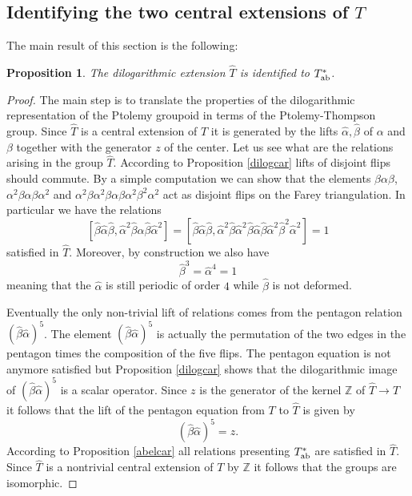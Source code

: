 \documentclass[twoside]{irmaems}
\theoremstyle{plain}
\newtheorem{proposition}[theorem]{Proposition}
\theoremstyle{definition}
\theoremstyle{remark}
\newcommand{\Z}{{\mathbb{Z}}}
\newcommand{\al}{\widehat{\alpha}}
\newcommand{\be}{\widehat{\beta}}
\begin{document}
\subsection{Identifying the two central extensions of $T$}\label{ident}

\vspace{0.2cm}
\noindent 
The main result of this section is the following: 

\begin{proposition} 
The dilogarithmic extension $\widehat{T}$ is identified to $T^*_{\rm ab}$. 
\end{proposition}
\begin{proof}
The main step is to translate the properties of the dilogarithmic 
representation of the Ptolemy groupoid in terms of the Ptolemy-Thompson group.  
Since $\widehat{T}$ is a central extension 
of $T$ it is generated by the lifts $\al,\be$ of $\alpha$ and $\beta$ 
together with the generator $z$ of the center. 
Let us see what are the relations arising in the 
group $\widehat{T}$.  According to Proposition \ref{dilogcar} 
lifts of disjoint flips should commute. By a simple computation we can 
show that 
the elements $\beta\alpha\beta$, $\alpha^2\beta\alpha\beta\alpha^2$ and 
$\alpha^2\beta\alpha^2\beta\alpha\beta\alpha^2\beta^2\alpha^2$ act as 
disjoint flips on the Farey triangulation. 
In particular we have the relations 
\[  [\be\al\be,\al^2\be\al\be\al^2]=
 [\be\al\be,\al^2\be\al^2\be\al\be\al^2\be^2\al^2]=1\]
satisfied in $\widehat{T}$. Moreover, by construction we also have  
\[\be^3=\al^4=1\]
meaning that the $\al$ is still periodic of order $4$ while $\be$ is not deformed.

\vspace{0.2cm}
\noindent 
Eventually the only non-trivial lift of relations comes from the 
pentagon relation $(\be\al)^5$.  The element $(\be\al)^5$ is actually 
the permutation of the two edges in the pentagon times the composition of the five flips.  
The pentagon equation is not anymore satisfied 
but Proposition \ref{dilogcar}  shows that the dilogarithmic image of  
$(\be\al)^5$ is a scalar operator. 
Since $z$ is the generator of the 
kernel $\Z$ of $\widehat{T}\to T$  
it follows that the lift of the pentagon equation from $T$ to 
$\widehat{T}$ is given by 
\[ (\be\al)^5=z.\]
According to Proposition \ref{abelcar} all relations presenting 
$T^*_{\rm ab}$ are satisfied  in $\widehat{T}$. Since $\widehat{T}$ is a 
nontrivial  central extension of $T$ by $\Z$ 
it follows that the groups are isomorphic.  
\end{proof}
\end{document}
